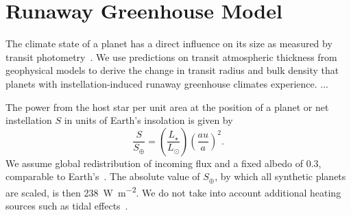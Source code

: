 \documentclass[twocolumn,twocolappendix]{aastex631}
\begin{document}
\section{Runaway Greenhouse Model}\label{sec:met_rghmodel}
The climate state of a planet has a direct influence on its size as measured by transit photometry~\citep{Turbet2019}.
We use predictions on transit atmospheric thickness from geophysical models to derive the change in transit radius and bulk density that planets with instellation-induced runaway greenhouse climates experience.
...

\begin{note}
    The power from the host star per unit area at the position of a planet or net instellation $S$ in units of Earth's insolation is given by
    \begin{equation}
        \frac{S}{S_\oplus} = \left(\frac{L_\star}{L_\odot}\right) \left(\frac{au}{a}\right)^2 .
    \end{equation}
    We assume global redistribution of incoming flux and a fixed albedo of $0.3$, comparable to Earth's~\citep{Haar1971}.
    The absolute value of $S_\oplus$, by which all synthetic planets are scaled, is then \SI{238}{\watt\per\square\meter}.
   We do not take into account additional heating sources such as tidal effects~\citep[e.g.][]{Barnes2013}.
\end{note}
\end{document}
